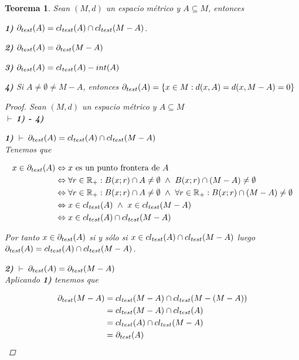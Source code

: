 \documentclass[oneside]{book} %
\theoremstyle{Teorema}
\newtheorem{Teorema}[Definicion]{Teorema}
\theoremstyle{Ejemplos}
\theoremstyle{[Obs]}
\def \test {test}
\newcommand{\cerradura}[2][\test]{\ifx \test #1 {\overline{#2}} \else {cl_{#1}(#2)} \fi} %
\newcommand{\frontera}[2][\test]{\ifx \test #1 {\partial(#2)} \else {\partial_{#1}(#2)} \fi} %
\renewcommand{\{}{\left\lbrace} %
\renewcommand{\}}{\right\rbrace} %
\newcommand{\y}{\ \wedge\ } %
\newcommand{\n}{\cap} %
\renewcommand{\sc}{\subseteq} %
\newcommand{\R}{\mathbb{R}} %
\newcommand{\pd}{$\vdash\ $} %
\begin{document}
			\begin{Teorema}\setlength{\parindent}{0em}
			
				Sean $(M, d)$ un espacio métrico y $A \sc M$, entonces 
				
				\textbf{1)} $\frontera{A} = \cerradura{A} \n \cerradura{M - A}$.
				
				\textbf{2)} $\frontera{A} = \frontera{M - A}$

				\textbf{3)} $\frontera{A} = \cerradura{A} - int(A)$ 

				\textbf{4)} Si $A \neq \emptyset \neq M - A$, entonces $\frontera{A} = \{ x \in M : d(x, A) = d(x, M - A) = 0 \}$

				\begin{proof}
					
					Sean $(M, d)$ un espacio métrico y $A \sc M$ \\ 
					\pd \textbf{1) - 4)}

					\textbf{1)} \pd $\frontera{A} = \cerradura{A} \n \cerradura{M - A}$ \\
					Tenemos que 

					\begin{align*}
						x \in \frontera{A} & \Leftrightarrow x \text{ es un punto frontera de } A \\ 
						& \Leftrightarrow \forall r \in \R_{+} : B(x;r) \n A \neq \emptyset \y B(x;r) \n (M - A) \neq \emptyset \\ 
						& \Leftrightarrow \forall r \in \R_{+} : B(x;r) \n A \neq \emptyset \y \forall r \in \R_{+} : B(x;r) \n (M - A) \neq \emptyset \\ 
						& \Leftrightarrow x \in \cerradura{A} \y x \in \cerradura{M - A} \\ 
						& \Leftrightarrow x \in \cerradura{A} \n \cerradura{M - A}
					\end{align*}

					Por tanto $x \in \frontera{A}$ si y sólo si $x \in \cerradura{A} \n \cerradura{M - A}$ luego $\frontera{A} = \cerradura{A} \n \cerradura{M - A}$.

					\textbf{2)} \pd $\frontera{A} = \frontera{M - A}$ \\ 
					Aplicando \textbf{1)} tenemos que 
					
					\begin{align*}
						\frontera{M - A} &= \cerradura{M - A} \n \cerradura{M - (M - A)} \\ 
						&= \cerradura{M - A} \n \cerradura{A} \\ 
						&= \cerradura{A} \n \cerradura{M - A} \\ 
						&= \frontera{A}
					\end{align*}
					

\end{proof}
\end{Teorema}
\end{document}
